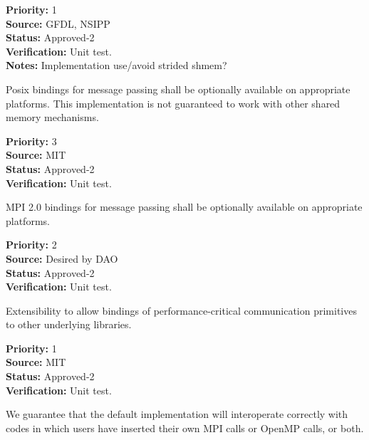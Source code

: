 \begin{reqlist}
{\bf Priority:} 1 \\
{\bf Source:}  GFDL, NSIPP \\
{\bf Status:} Approved-2 \\
{\bf Verification:} Unit test. \\
{\bf Notes:} Implementation use/avoid strided shmem? 
\end{reqlist}


Posix bindings for message passing shall be optionally
available on appropriate platforms.  This implementation
is not guaranteed to work with other shared memory mechanisms.

\begin{reqlist}
{\bf Priority:} 3 \\
{\bf Source:}  MIT \\
{\bf Status:} Approved-2 \\
{\bf Verification:} Unit test. \\ 
\end{reqlist}


MPI 2.0 bindings for message passing shall be optionally
available on appropriate platforms.

\begin{reqlist}
{\bf Priority:} 2 \\
{\bf Source:}  Desired by DAO \\
{\bf Status:} Approved-2 \\
{\bf Verification:} Unit test. \\ 
\end{reqlist}


Extensibility to allow bindings of performance-critical communication
primitives to other underlying libraries.

\begin{reqlist}
{\bf Priority:} 1 \\
{\bf Source:}  MIT \\
{\bf Status:} Approved-2 \\
{\bf Verification:} Unit test. \\ 
\end{reqlist}



We guarantee that the default implementation will interoperate correctly
with codes in which users have inserted their own MPI calls or OpenMP 
calls, or both.  

